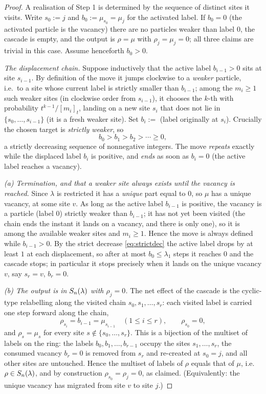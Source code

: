 \begin{proof}
A realisation of Step 1 is determined by the sequence of distinct sites it visits.
Write $s_0:=j$ and $b_0:=\mu_{s_0}=\mu_j$ for the activated label. If $b_0=0$
(the activated particle is the vacancy) there are no particles weaker than label
$0$, the cascade is empty, and the output is $\rho=\mu$ with $\rho_j=\mu_j=0$;
all three claims are trivial in this case. Assume henceforth $b_0>0$.

\smallskip
\noindent\emph{The displacement chain.} Suppose inductively that the active label
$b_{i-1}>0$ sits at site $s_{i-1}$. By definition of the move it jumps clockwise
to a \emph{weaker} particle, i.e.\ to a site whose current label is strictly
smaller than $b_{i-1}$; among the $m_i\ge1$ such weaker sites (in clockwise order
from $s_{i-1}$), it chooses the $k$-th with probability $t^{k-1}/[m_i]_t$, landing
on a new site $s_i$ that does not lie in $\{s_0,\dots,s_{i-1}\}$ (it is a fresh
weaker site). Set $b_i:=$ (label originally at $s_i$). Crucially the chosen target
is \emph{strictly weaker}, so
\begin{equation}\label{eq:strictdec}
b_0>b_1>b_2>\cdots\ge0 ,
\end{equation}
a strictly decreasing sequence of nonnegative integers. The move \emph{repeats}
exactly while the displaced label $b_i$ is positive, and \emph{ends} as soon as
$b_i=0$ (the active label reaches a vacancy).

\smallskip
\noindent\emph{(a) Termination, and that a weaker site always exists until the
vacancy is reached.} Since $\lambda$ is restricted it has a \emph{unique} part
equal to $0$, so $\mu$ has a unique vacancy, at some site $v$. As long as the
active label $b_{i-1}$ is positive, the vacancy is a particle (label $0$) strictly
weaker than $b_{i-1}$; it has not yet been visited (the chain ends the instant it
lands on a vacancy, and there is only one), so it is among the available weaker
sites and $m_i\ge1$. Hence the move is always defined while $b_{i-1}>0$. By the
strict decrease \eqref{eq:strictdec} the active label drops by at least $1$ at
each displacement, so after at most $b_0\le\lambda_1$ steps it reaches $0$ and the
cascade stops; in particular it stops precisely when it lands on the unique
vacancy $v$, say $s_r=v$, $b_r=0$.

\smallskip
\noindent\emph{(b) The output is in $S_n(\lambda)$ with $\rho_j=0$.} The net effect
of the cascade is the cyclic-type relabelling along the visited chain
$s_0,s_1,\dots,s_r$: each visited label is carried one step forward along the
chain,
\[
\rho_{s_i}=b_{i-1}=\mu_{s_{i-1}}\quad(1\le i\le r),\qquad \rho_{s_0}=0,
\]
and $\rho_s=\mu_s$ for every site $s\notin\{s_0,\dots,s_r\}$. This is a bijection
of the multiset of labels on the ring: the labels $b_0,b_1,\dots,b_{r-1}$ occupy
the sites $s_1,\dots,s_r$, the consumed vacancy $b_r=0$ is removed from $s_r$ and
re-created at $s_0=j$, and all other sites are untouched. Hence the multiset of
labels of $\rho$ equals that of $\mu$, i.e.\ $\rho\in S_n(\lambda)$, and by
construction $\rho_{s_0}=\rho_j=0$, as claimed. (Equivalently: the unique vacancy
has migrated from site $v$ to site $j$.)


\end{proof}
